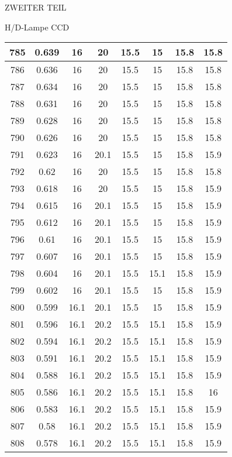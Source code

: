 \begin{appendix}
\begin{chapter}{ZWEITER TEIL}
\begin{section}{H/D-Lampe CCD}
\begin{scriptsize}
\begin{longtable}[htbp]{|c|c|c|c|c|c|c|c|}
            785 & 0.639 & 16 & 20 & 15.5 & 15 & 15.8 & 15.8 \\ \hline
            786 & 0.636 & 16 & 20 & 15.5 & 15 & 15.8 & 15.8 \\ \hline
            787 & 0.634 & 16 & 20 & 15.5 & 15 & 15.8 & 15.8 \\ \hline
            788 & 0.631 & 16 & 20 & 15.5 & 15 & 15.8 & 15.8 \\ \hline
            789 & 0.628 & 16 & 20 & 15.5 & 15 & 15.8 & 15.8 \\ \hline
            790 & 0.626 & 16 & 20 & 15.5 & 15 & 15.8 & 15.8 \\ \hline
            791 & 0.623 & 16 & 20.1 & 15.5 & 15 & 15.8 & 15.9 \\ \hline
            792 & 0.62 & 16 & 20 & 15.5 & 15 & 15.8 & 15.8 \\ \hline
            793 & 0.618 & 16 & 20 & 15.5 & 15 & 15.8 & 15.9 \\ \hline
            794 & 0.615 & 16 & 20.1 & 15.5 & 15 & 15.8 & 15.9 \\ \hline
            795 & 0.612 & 16 & 20.1 & 15.5 & 15 & 15.8 & 15.9 \\ \hline
            796 & 0.61 & 16 & 20.1 & 15.5 & 15 & 15.8 & 15.9 \\ \hline
            797 & 0.607 & 16 & 20.1 & 15.5 & 15 & 15.8 & 15.9 \\ \hline
            798 & 0.604 & 16 & 20.1 & 15.5 & 15.1 & 15.8 & 15.9 \\ \hline
            799 & 0.602 & 16 & 20.1 & 15.5 & 15 & 15.8 & 15.9 \\ \hline
            800 & 0.599 & 16.1 & 20.1 & 15.5 & 15 & 15.8 & 15.9 \\ \hline
            801 & 0.596 & 16.1 & 20.2 & 15.5 & 15.1 & 15.8 & 15.9 \\ \hline
            802 & 0.594 & 16.1 & 20.2 & 15.5 & 15.1 & 15.8 & 15.9 \\ \hline
            803 & 0.591 & 16.1 & 20.2 & 15.5 & 15.1 & 15.8 & 15.9 \\ \hline
            804 & 0.588 & 16.1 & 20.2 & 15.5 & 15.1 & 15.8 & 15.9 \\ \hline
            805 & 0.586 & 16.1 & 20.2 & 15.5 & 15.1 & 15.8 & 16 \\ \hline
            806 & 0.583 & 16.1 & 20.2 & 15.5 & 15.1 & 15.8 & 15.9 \\ \hline
            807 & 0.58 & 16.1 & 20.2 & 15.5 & 15.1 & 15.8 & 15.9 \\ \hline
            808 & 0.578 & 16.1 & 20.2 & 15.5 & 15.1 & 15.8 & 15.9 \\ \hline

\end{longtable}
\end{scriptsize}
\end{section}
\end{chapter}
\end{appendix}
